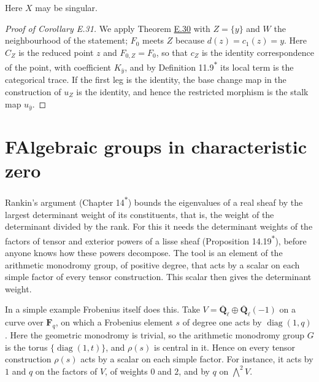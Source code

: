 \documentclass[11pt]{article}
\newcommand{\bpout}[1]{#1\textsuperscript{\hyperlink{bp-outside}{\ensuremath{\ast}}}}
\begin{document}
\label{bp316}%
Here \(X\) may be singular.

\begin{proof}[{Proof of Corollary E.31}]\label{bp317}%
We apply Theorem \hyperref[bp311]{E.30} with \(Z=\{y\}\) and \(W\) the neighbourhood of the statement; \(F_0\) meets \(Z\) because \(d(z)=c_1(z)=y\). Here \(C_Z\) is the reduced point \(z\) and \(F_{0,Z}=F_0\), so that \(c_Z\) is the identity correspondence of the point, with coefficient \(K_{\bar y}\), and by Definition \bpout{11.9} its local term is the categorical trace. If the first leg is the identity, the base change map in the construction of \(u_Z\) is the identity, and hence the restricted morphism is the stalk map \(u_{\bar y}\).
\end{proof}



\section*{\texorpdfstring{F\quad Algebraic groups in characteristic zero}{F Algebraic groups in characteristic zero}}
\label{bp318}%
\label{bp319}%
Rankin's argument (Chapter \bpout{14}) bounds the eigenvalues of a real sheaf by the largest determinant weight of its constituents, that is, the weight of the determinant divided by the rank. For this it needs the determinant weights of the factors of tensor and exterior powers of a lisse sheaf (Proposition \bpout{14.19}), before anyone knows how these powers decompose. The tool is an element of the arithmetic monodromy group, of positive degree, that acts by a scalar on each simple factor of every tensor construction. This scalar then gives the determinant weight.

In a simple example Frobenius itself does this. Take \(V=\overline{\mathbf Q}_\ell\oplus\overline{\mathbf Q}_\ell(-1)\) on a curve over \(\mathbf F_q\), on which a Frobenius element \(s\) of degree one acts by \(\operatorname{diag}(1,q)\). Here the geometric monodromy is trivial, so the arithmetic monodromy group \(G\) is the torus \(\{\operatorname{diag}(1,t)\}\), and \(\rho(s)\) is central in it. Hence on every tensor construction \(\rho(s)\) acts by a scalar on each simple factor. For instance, it acts by \(1\) and \(q\) on the factors of \(V\), of weights \(0\) and \(2\), and by \(q\) on \(\bigwedge^2V\).
\end{document}
